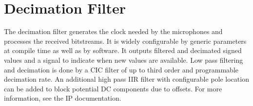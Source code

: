 
\section{Decimation Filter}
\label{sec::filter}

The decimation filter generates the clock needed by the microphones and processes the received bitstreams.
It is widely configurable by generic parameters at compile time as well as by software. 
It outputs filtered and decimated signed values and a signal to indicate when new values are available.
Low pass filtering and decimation is done by a CIC filter of up to third order and programmable decimation rate.
An additional high pass IIR filter with configurable pole location can be added to block potential DC components due to offsets.
For more information, see the IP documentation.